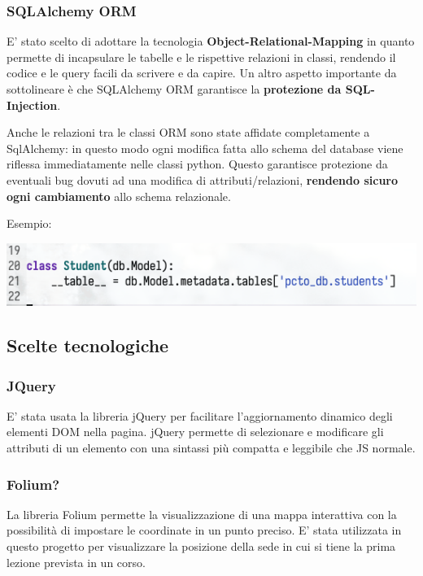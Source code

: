 \documentclass[11pt]{article}
\begin{document}
\subsubsection{SQLAlchemy ORM}
\label{sec:org6bc3f59}

E' stato scelto di adottare la tecnologia \textbf{Object-Relational-Mapping} in quanto permette di incapsulare le tabelle e le rispettive relazioni in classi, rendendo il codice e le query facili da scrivere e da capire. Un altro aspetto importante da sottolineare è che SQLAlchemy ORM garantisce la \textbf{protezione da SQL-Injection}.

Anche le relazioni tra le classi ORM sono state affidate completamente a SqlAlchemy: in questo modo ogni modifica fatta allo schema del database viene riflessa immediatamente nelle classi python. Questo garantisce protezione da eventuali bug dovuti ad una modifica di attributi/relazioni, \textbf{rendendo sicuro ogni cambiamento} allo schema relazionale.

Esempio:

\begin{center}
\includegraphics[width=.9\linewidth]{./resources/orm.png}
\end{center}

\subsection{Scelte tecnologiche}
\label{sec:orgd7820eb}

\subsubsection{JQuery}
\label{sec:org3ef6637}
E' stata usata la libreria jQuery per facilitare l'aggiornamento dinamico degli elementi DOM nella pagina. jQuery permette di selezionare e modificare gli attributi di un elemento con una sintassi più compatta e leggibile che JS normale.

\subsubsection{Folium?}
\label{sec:org1c72b65}
La libreria Folium permette la visualizzazione di una mappa interattiva con la possibilità di impostare le coordinate in un punto preciso. E' stata utilizzata in questo progetto per visualizzare la posizione della sede in cui si tiene la prima lezione prevista in un corso.
\end{document}
